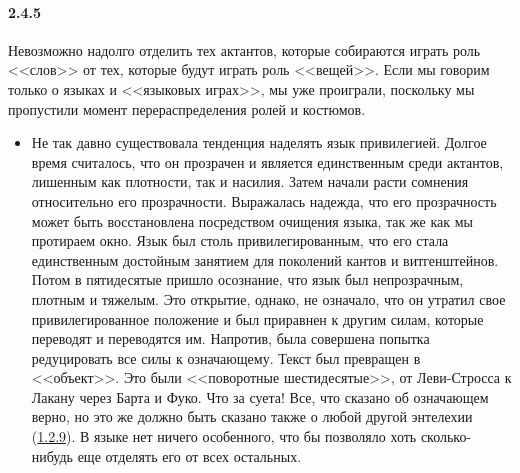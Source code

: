\paragraph{2.4.5}\hypertarget{par:2.4.5}{} Невозможно надолго отделить тех актантов, которые собираются играть роль <<слов>> от тех, которые будут играть роль <<вещей>>. Если мы говорим только о языках и <<языковых играх>>, мы уже проиграли, поскольку мы пропустили момент перераспределения ролей и костюмов. 
	\begin{itemize}
	\item 
	Не так давно существовала тенденция наделять язык привилегией. Долгое время считалось, что он прозрачен и является единственным среди актантов, лишенным как плотности, так и насилия. Затем начали расти сомнения относительно его прозрачности. Выражалась надежда, что его прозрачность может быть восстановлена посредством очищения языка, так же как мы протираем окно. Язык был столь привилегированным, что его стала единственным достойным занятием для поколений кантов и витгенштейнов. Потом в пятидесятые пришло осознание, что язык был непрозрачным, плотным и тяжелым. Это открытие, однако, не означало, что он утратил свое привилегированное положение и был приравнен к другим силам, которые переводят и переводятся им. Напротив, была совершена попытка редуцировать все силы к означающему. Текст был превращен в <<объект>>. Это были <<поворотные шестидесятые>>, от Леви-Стросса к Лакану через Барта и Фуко. Что за суета! Все, что сказано об означающем верно, но это же должно быть сказано также о любой другой энтелехии (\hyperlink{par:1.2.9}{1.2.9}). В языке нет ничего особенного, что бы позволяло хоть сколько-нибудь еще отделять его от всех остальных. 
	\end{itemize}


